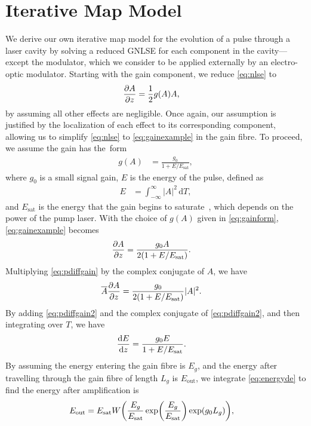 \documentclass[9pt,twocolumn,twoside]{osajnl}
\let\originalleft\left
\let\originalright\right
\renewcommand{\left}{\mathopen{}\mathclose\bgroup\originalleft}
\renewcommand{\right}{\aftergroup\egroup\originalright}
\providecommand{\df}{\textrm{d}} %
\newcommand{\diff}[3][\hspace{-0.5pt}]{\frac{\df^{#1}#2}{\df{#3}^{#1}}} %
\newcommand{\pdiff}[3][\hspace{-0.5pt}]{\frac{\partial^{#1}#2}{\partial{#3}^{#1}}} %
\newcommand{\Es}{E_{\textrm{sat}}} %
\begin{document}
\section{Iterative Map Model}
\label{sec:model}
We derive our own iterative map model for the evolution of a pulse through a laser cavity by solving a reduced GNLSE for each component in the cavity---except the modulator, which we consider to be applied externally by an electro-optic modulator. Starting with the gain component, we reduce \eqref{eq:nlse} to 
\begin{align}
	\pdiff{A}{z} &= \frac{1}{2}g(A)A,
	\label{eq:gainexample}
\end{align}
by assuming all other effects are negligible. Once again, our assumption is justified by the localization of each effect to its corresponding component, allowing us to simplify \eqref{eq:nlse} to \eqref{eq:gainexample} in the gain fibre. To proceed, we assume the gain has the~form
\begin{align}
	g(A) &= \frac{g_0}{1 + E / \Es},
	\label{eq:gainform}
\end{align}
where $g_0$ is a small signal gain, $E$ is the energy of the pulse, defined as
\begin{align}
	E &= \int_{-\infty}^\infty |A|^2 \, \df T,
	\label{eq:energy}
\end{align}
and $\Es$ is the energy that the gain begins to saturate~\cite{haus1984, shtyrina2017, silfvast2004}, which depends on the power of the pump laser. With the choice of $g(A)$ given in \eqref{eq:gainform}, \eqref{eq:gainexample} becomes
\begin{align}
	\pdiff{A}{z} &= \frac{g_0 A}{2 \left( 1 + E / \Es \right)}.
	\label{eq:pdiffgain}
\end{align}
Multiplying \eqref{eq:pdiffgain} by the complex conjugate of $A$, we have
\begin{align}
	\overline{A} \pdiff{A}{z} &= \frac{g_0}{2 \left( 1 + E / \Es \right)} |A|^2.
	\label{eq:pdiffgain2}
\end{align}
By adding \eqref{eq:pdiffgain2} and the complex conjugate of \eqref{eq:pdiffgain2}, and then integrating over $T$, we have
\begin{align}
	\diff{E}{z} &= \frac{g_0 E}{1 + E / \Es}.
	\label{eq:energyde}
\end{align}
By assuming the energy entering the gain fibre is $E_g$, and the energy after travelling through the gain fibre of length $L_g$ is $E_{\text{out}}$, we integrate \eqref{eq:energyde} to find the energy after amplification is
\begin{align}
	\label{eq:engain}
	E_{\text{out}} &= \Es W \left( \frac{E_g}{\Es} \exp \left( \frac{E_g}{\Es} \right) \exp( g_0 L_g ) \right),
\end{align}
\end{document}

